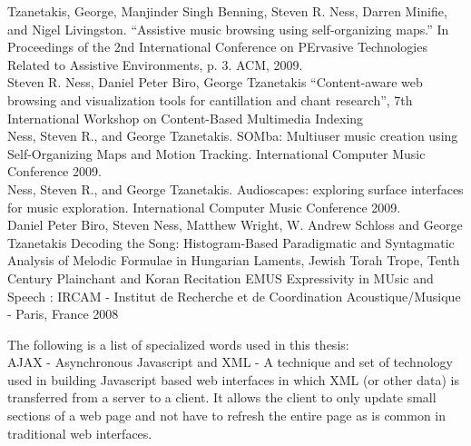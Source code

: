 \documentclass[12pt,oneside]{book}
\begin{document}
\cite{tzanetakis2009assistive}
Tzanetakis, George, Manjinder Singh Benning, Steven R. Ness, Darren
Minifie, and Nigel Livingston. ``Assistive music browsing using
self-organizing maps.'' In Proceedings of the 2nd International
Conference on PErvasive Technologies Related to Assistive
Environments, p. 3. ACM, 2009.
\\

\cite{ness2009content}
Steven R. Ness, Daniel Peter Biro, George Tzanetakis ``Content-aware
web browsing and visualization tools for cantillation and chant
research'', 7th International Workshop on Content-Based Multimedia
Indexing
\\

\cite{ness2009somba}
Ness, Steven R., and George Tzanetakis. SOMba: Multiuser music
creation using Self-Organizing Maps and Motion Tracking. International
Computer Music Conference 2009.
\\

\cite{ness2009audioscapes}
Ness, Steven R., and George Tzanetakis. Audioscapes: exploring surface
interfaces for music exploration. International Computer Music Conference 2009.
\\

\cite{ness2008decoding}
Daniel Peter Biro, Steven Ness, Matthew Wright, W. Andrew Schloss and
George Tzanetakis Decoding the Song: Histogram-Based Paradigmatic and
Syntagmatic Analysis of Melodic Formulae in Hungarian Laments, Jewish
Torah Trope, Tenth Century Plainchant and Koran Recitation EMUS
Expressivity in MUsic and Speech : IRCAM - Institut de Recherche et de
Coordination Acoustique/Musique - Paris, France 2008
\\




\label{chap:glossary}

The following is a list of specialized words used in this thesis:
\\

AJAX - Asynchronous Javascript and XML - A technique and set of
technology used in building Javascript based web interfaces in which
XML (or other data) is transferred from a server to a client.  It
allows the client to only update small sections of a web page and not
have to refresh the entire page as is common in traditional web
interfaces. \\
\end{document}
